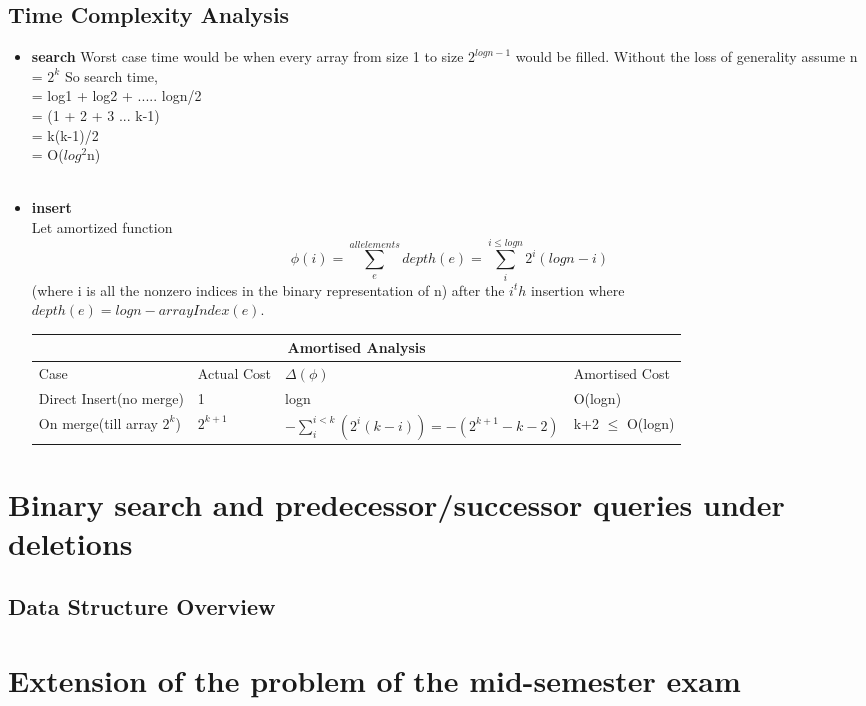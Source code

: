 \documentclass{article}
\begin{document}
\subsection{Time Complexity Analysis}
\begin{itemize}
  \item \textbf{search} Worst case time would be when every array from size 1 to size $2^{logn-1}$ would be filled. Without the loss of generality assume n = $2^k$
    So search time,\\
    = log1 + log2 + $.....$ logn/2 \\
    = (1 + 2 + 3 $...$ k-1) \\
    = k(k-1)/2 \\
    = O($log^2$n) \\
    \\
  \item \textbf{insert}\\
    Let amortized function $$\phi(i) = \sum_{e}^{all elements}depth(e)  = \sum_{i}^{i \leq logn} 2^i(logn - i) $$ (where i is all the nonzero indices in the binary representation of n) after the $i^th$ insertion where \\
    $depth(e) = logn - arrayIndex(e)$.\\
    \begin{tabular}{|p{4cm}|p{3cm}|p{3cm}|p{3cm}|  }
      \hline
      \multicolumn{4}{|c|}{Amortised Analysis} \\
      \hline
      Case & Actual Cost& $\Delta(\phi)$ & Amortised Cost\\
      \hline
      Direct Insert(no merge) & 1           & logn & O(logn)   \\
      On merge(till array $2^k$) & $2^{k+1}$   & $-\sum_{i}^{i<k} (2^i(k-i)) = -(2^{k+1} -k - 2)$ & k+2 $\leq$ O(logn) \\
      \hline
    \end{tabular}

\end{itemize}

\newpage
\section{Binary search and predecessor/successor queries under deletions}
\subsection{Data Structure Overview}

\newpage    
\section{Extension of the problem of the mid-semester exam}
\end{document}
